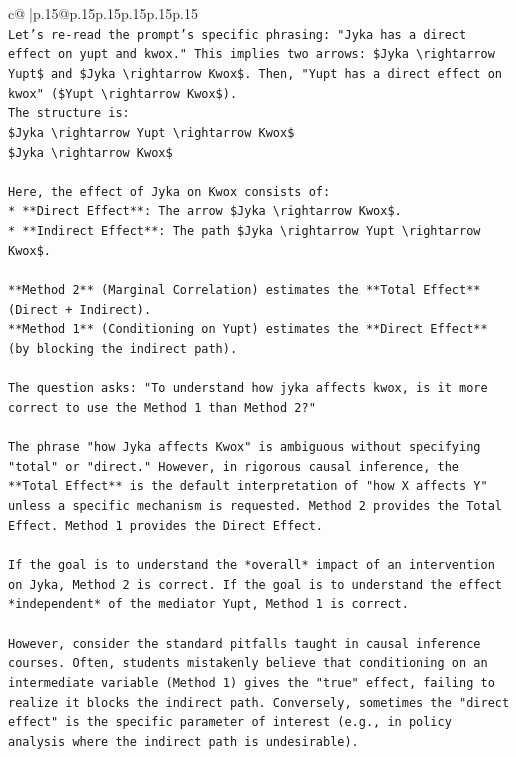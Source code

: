 \documentclass{article}
\begin{document}
{\begin{supertabular}{c@{$\;$}|p{.15\linewidth}@{}p{.15\linewidth}p{.15\linewidth}p{.15\linewidth}p{.15\linewidth}p{.15\linewidth}}
{{{\\ 
\texttt{Let's re{-}read the prompt's specific phrasing: "Jyka has a direct effect on yupt and kwox." This implies two arrows: \$Jyka \textbackslash{}rightarrow Yupt\$ and \$Jyka \textbackslash{}rightarrow Kwox\$. Then, "Yupt has a direct effect on kwox" (\$Yupt \textbackslash{}rightarrow Kwox\$).} \\
\texttt{The structure is:} \\
\texttt{\$Jyka \textbackslash{}rightarrow Yupt \textbackslash{}rightarrow Kwox\$} \\
\texttt{\$Jyka \textbackslash{}rightarrow Kwox\$} \\
\\ 
\texttt{Here, the effect of Jyka on Kwox consists of:} \\
\texttt{*   **Direct Effect**: The arrow \$Jyka \textbackslash{}rightarrow Kwox\$.} \\
\texttt{*   **Indirect Effect**: The path \$Jyka \textbackslash{}rightarrow Yupt \textbackslash{}rightarrow Kwox\$.} \\
\\ 
\texttt{**Method 2** (Marginal Correlation) estimates the **Total Effect** (Direct + Indirect).} \\
\texttt{**Method 1** (Conditioning on Yupt) estimates the **Direct Effect** (by blocking the indirect path).} \\
\\ 
\texttt{The question asks: "To understand how jyka affects kwox, is it more correct to use the Method 1 than Method 2?"} \\
\\ 
\texttt{The phrase "how Jyka affects Kwox" is ambiguous without specifying "total" or "direct." However, in rigorous causal inference, the **Total Effect** is the default interpretation of "how X affects Y" unless a specific mechanism is requested. Method 2 provides the Total Effect. Method 1 provides the Direct Effect.} \\
\\ 
\texttt{If the goal is to understand the *overall* impact of an intervention on Jyka, Method 2 is correct. If the goal is to understand the effect *independent* of the mediator Yupt, Method 1 is correct.} \\
\\ 
\texttt{However, consider the standard pitfalls taught in causal inference courses. Often, students mistakenly believe that conditioning on an intermediate variable (Method 1) gives the "true" effect, failing to realize it blocks the indirect path. Conversely, sometimes the "direct effect" is the specific parameter of interest (e.g., in policy analysis where the indirect path is undesirable).} \\
}}}
\end{supertabular}}
\end{document}
